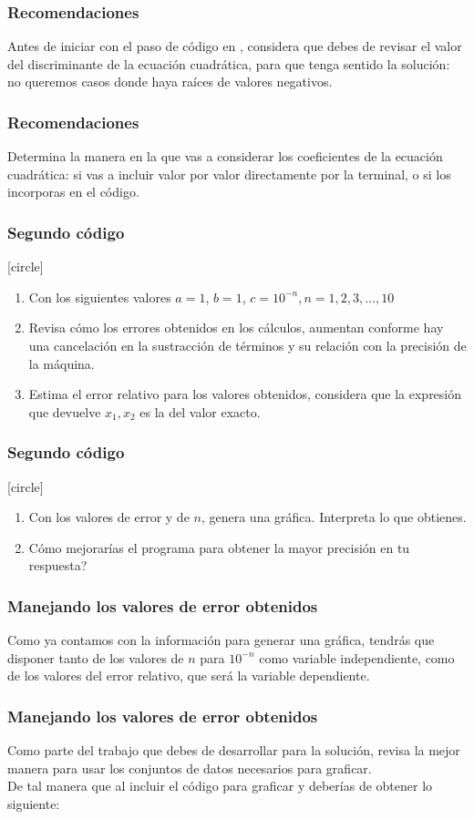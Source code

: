\begin{frame}
\frametitle{Recomendaciones}
Antes de iniciar con el paso de código en \python, considera que debes de revisar el valor del discriminante de la ecuación cuadrática, para que tenga sentido la solución: no queremos casos donde haya raíces de valores negativos.
\end{frame}
\begin{frame}
\frametitle{Recomendaciones}
Determina la manera en la que vas a considerar los coeficientes de la ecuación cuadrática: si vas a incluir valor por valor directamente por la terminal, o si los incorporas en el código.
\end{frame}
\begin{frame}
\frametitle{Segundo código}
[circle]
\begin{enumerate}
\conti
\item Con los siguientes valores $a=1$, $b=1$, $c=10^{-n}, n = 1, 2, 3, \ldots, 10$
\item Revisa cómo los errores obtenidos en los cálculos, aumentan conforme hay una cancelación en la sustracción de términos y su relación con la precisión de la máquina.
\item Estima el error relativo para los valores obtenidos, considera que la expresión que devuelve $x_{1}, x_{2}$ es la del valor exacto.
\seti
\end{enumerate}
\end{frame}
\begin{frame}
\frametitle{Segundo código}
[circle]
\begin{enumerate}[<+->]
\conti
\item Con los valores de error y de $n$, genera una gráfica. Interpreta lo que obtienes.
\item Cómo mejorarías el programa para obtener la mayor precisión en tu respuesta?
\end{enumerate}
\end{frame}
\begin{frame}
\frametitle{Manejando los valores de error obtenidos}
Como ya contamos con la información para generar una gráfica, tendrás que disponer tanto de los valores de $n$ para $10^{-n}$ como variable independiente, como de los valores del error relativo, que será la variable dependiente.
\end{frame}
\begin{frame}
\frametitle{Manejando los valores de error obtenidos}
Como parte del trabajo que debes de desarrollar para la solución, revisa la mejor manera para usar los conjuntos de datos necesarios para graficar.
\\
\bigskip
De tal manera que al incluir el código para graficar y deberías de obtener lo siguiente:
\end{frame}
